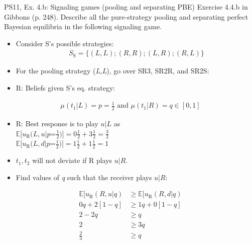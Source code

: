 \begin{frame}{PS11, Ex. 4.b: Signaling games (pooling and separating PBE)}
    Exercise 4.4.b in Gibbons (p. 248). Describe all the pure-strategy pooling and separating perfect Bayesian equilibria in the following signaling game.\vspace{-8pt}
    \begin{multicols}{2}
      \begin{itemize}
        \item Consider S's possible strategies:\vspace{-4pt}\begin{align*}S_\text{S}=\{(L,L);(R,R);(L,R);(R,L)\} \end{align*}\vspace{-16pt}
        \item[Step 1:] For the pooling strategy (\textit{L,L}), go over SR3, SR2R, and SR2S:
        \item[SR3:] R: Beliefs given S's eq. strategy:
      \end{itemize}\vspace{-8pt}
      \begin{align*}
        \mu(t_1|L)=p=\frac{1}{2}\text{ and }\mu(t_1|R)=q\in[0,1]
      \end{align*}\vspace{-16pt}
      \begin{itemize}
        \item[SR2R:] R: Best response is to play $u|L$ as\\
        $\mathbb{E}[u_\text{R}(L,u|p$=$\frac{1}{2})]=0\frac{1}{2}+3\frac{1}{2}=\frac{3}{2}$\\
        $\mathbb{E}[u_\text{R}(L,d|p$=$\frac{1}{2})]=1\frac{1}{2}+1\frac{1}{2}=1$
        \item[SR2S:] $t_1,t_2$ will not deviate if R plays $u|R$.
        \item[PBE:]  Find values of \textit{q} such that the receiver plays $u|R$:
      \end{itemize}\vspace{-8pt}
      \begin{align*}
        \mathbb{E}[u_\text{R}(R,u|q)&\geq\mathbb{E}[u_\text{R}(R,d|q)\\
        0q+2[1-q]&\geq1q+0[1-q]\\
        2-2q&\geq q\\
        2&\geq 3q\\
        \frac{2}{3}&\geq q
      \end{align*}\vspace{-16pt}

\end{multicols}
\end{frame}
